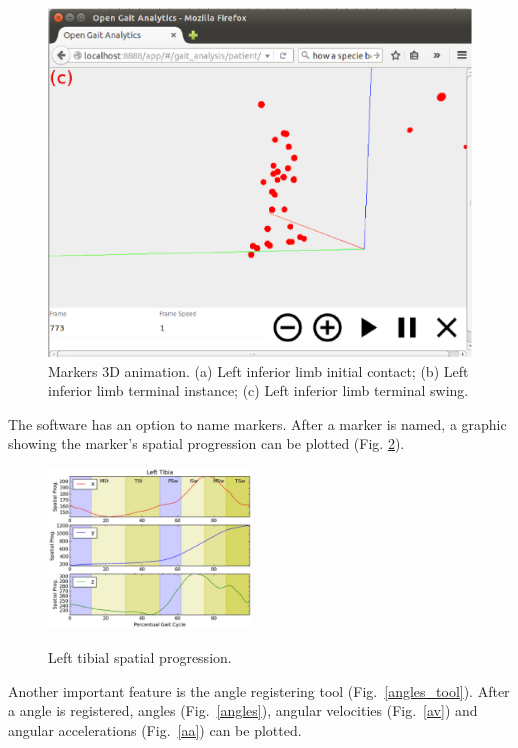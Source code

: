 \documentclass[journal]{IEEEtran}
\begin{document}
\begin{figure}[tb]
\begin{minipage}[b]{0.32\textwidth}
    \includegraphics[width=\textwidth]{img/animation3.eps}
  \end{minipage}
  \caption{Markers 3D animation. 
	  (a) Left inferior limb initial contact;
	  (b) Left inferior limb terminal instance;
	  (c) Left inferior limb terminal swing.
  }
  \label{animation}
\end{figure}

The software has an option to name markers. After a marker is named, a graphic showing the 
marker's spatial progression can be plotted (Fig. \ref{spatial_progression}). 
\begin{figure}[!t]
	\centering
	{\includegraphics[width=0.48\textwidth]{img/spatial_progression.eps}}
	\caption{Left tibial spatial progression.}
	\label{spatial_progression}
\end{figure}

Another important feature is the angle registering tool (Fig.~\ref{angles_tool}). 
After a angle is registered, angles (Fig.~\ref{angles}), angular velocities (Fig.~\ref{av}) 
and angular accelerations (Fig.~\ref{aa}) can be plotted.
\end{document}

